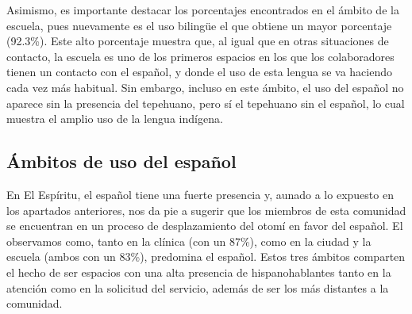 \documentclass[output=paper]{../langscibook}
\begin{document}
Asimismo, es importante destacar los porcentajes encontrados en el ámbito de la escuela, pues nuevamente es el uso bilingüe el que obtiene un mayor porcentaje (92.3\%). Este alto porcentaje muestra que, al igual que en otras situaciones de contacto, la escuela es uno de los primeros espacios en los que los colaboradores tienen un contacto con el español, y donde el uso de esta lengua se va haciendo cada vez más habitual. Sin embargo, incluso en este ámbito, el uso del español no aparece sin la presencia del tepehuano, pero sí el tepehuano sin el español, lo cual muestra el amplio uso de la lengua indígena.

\begin{table}
\caption{\label{tab:guerrero:14} Ámbitos de Santa María de Ocotán en que se prefiere el bilingüismo (BL)}
\end{table}



 \subsection{Ámbitos de uso del español}



En El Espíritu, el español tiene una fuerte presencia y, aunado a lo expuesto en los apartados anteriores, nos da pie a sugerir que los miembros de esta comunidad se encuentran en un proceso de desplazamiento del otomí en favor del español. El  observamos como, tanto en la clínica (con un 87\%), como en la ciudad y la escuela (ambos con un 83\%), predomina el español. Estos tres ámbitos comparten el hecho de ser espacios con una alta presencia de hispanohablantes tanto en la atención como en la solicitud del servicio, además de ser los más distantes a la comunidad.
\end{document}
